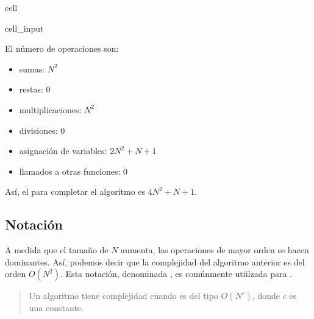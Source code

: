 \documentclass[letterpaper,10pt,english]{jupyterBook}
\begin{document}
\begin{sphinxuseclass}{cell}\begin{sphinxVerbatimInput}

\begin{sphinxuseclass}{cell_input}
\begin{sphinxVerbatim}[commandchars=\\\{\}]
 
      
       
           
              
     
\end{sphinxVerbatim}

\end{sphinxuseclass}\end{sphinxVerbatimInput}

\end{sphinxuseclass}
\sphinxAtStartPar
El número de operaciones son:
\begin{itemize}
\item {} 
\sphinxAtStartPar
sumas: \(N^2\)

\item {} 
\sphinxAtStartPar
restas: 0

\item {} 
\sphinxAtStartPar
multiplicaciones: \(N^2\)

\item {} 
\sphinxAtStartPar
divisiones: 0

\item {} 
\sphinxAtStartPar
asignación de variables: \(2N^2 + N + 1\)

\item {} 
\sphinxAtStartPar
llamados a otras funciones: 0

\end{itemize}

\sphinxAtStartPar
Así, el  para completar el algoritmo es \(4N^2+N+1\).


\subsection{Notación }
\label{\detokenize{1.1-Aspectos_generales/1.1-Aspectos_generales:notacion-big-o}}
\sphinxAtStartPar
A medida que el tamaño de \(N\) aumenta, las operaciones de mayor orden se hacen dominantes. Así, podemos decir que la complejidad del algoritmo anterior es del orden \(O(N^2)\). Esta notación, denominada , es comúnmente utiilzada para .
\begin{quote}

\sphinxAtStartPar
{} Un algoritmo tiene complejidad  cuando es del tipo \(O(N^c)\), donde \(c\) es una constante.
\end{quote}
\end{document}
